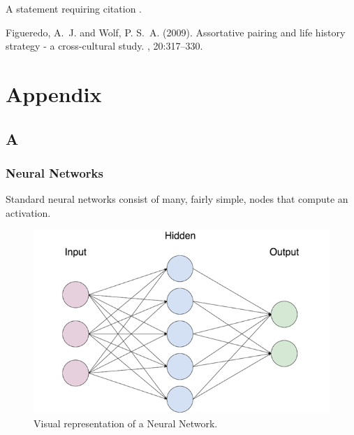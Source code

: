A statement requiring citation \cite{Figueredo:2009dg}.


\begin{thebibliography}{99} %

Figueredo, A.~J. and Wolf, P. S.~A. (2009).
\newblock Assortative pairing and life history strategy - a cross-cultural
  study.
, 20:317--330.



 
\end{thebibliography}

\section*{Appendix}
\subsection*{A}
\subsubsection*{Neural Networks}
Standard neural networks consist of many, fairly simple, nodes that compute an activation. 

\begin{figure}[h]
	\includegraphics[width=\columnwidth]{fig8.png} 
	\caption{Visual representation of a Neural Network.}
\end{figure}

